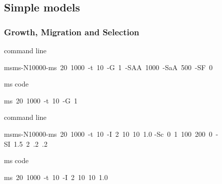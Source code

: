 \documentclass{beamer}
\begin{document}
\subsection{Simple models}
\begin{frame}[t,fragile]
\frametitle{Growth, Migration and Selection}

\newcommand{\suck}{\hspace{-.1cm}}

\begin{block}{command line}
\begin{semiverbatim}
\small
\mbox{msms\suck -N\suck 10000\suck -ms 20 1000 -t
10 -G 1 -SAA 1000 -SaA 500 -SF 0}
\end{semiverbatim}
\end{block}

\begin{block}{ms code}
\begin{semiverbatim}
\mbox{ms 20 1000 -t 10 -G 1} 
\end{semiverbatim}
\end{block}


\newcommand{\suck}{\hspace{-.1cm}}

\begin{block}{command line} 
\begin{semiverbatim}
\small
\mbox{msms\suck -N\suck 10000\suck -ms 20 1000 -t 10 -I 2 10 10
 1.0} 
 \mbox{-Sc 0 1 100 200 0 -SI 1.5 2 .2 .2}
\end{semiverbatim}
\end{block}

\begin{block}{ms code}
\begin{semiverbatim}
\mbox{ms 20 1000 -t 10 -I 2 10 10 1.0} 
\end{semiverbatim}
\end{block}

\end{frame}
\end{document}
